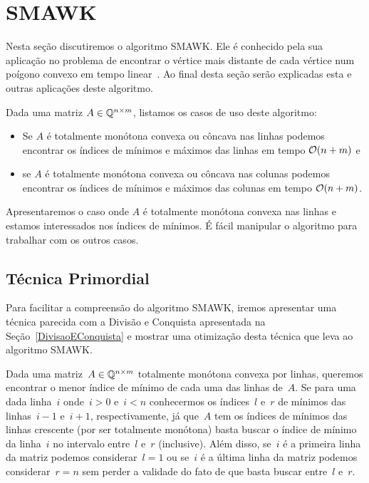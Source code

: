 \section{SMAWK}
\label{SMAWK}


Nesta seção discutiremos o algoritmo SMAWK. Ele é conhecido pela sua aplicação no problema de encontrar o vértice mais distante de cada vértice num poígono convexo em tempo linear~\cite{Aggarwal:1987}. Ao final desta seção serão explicadas esta e outras aplicações deste algoritmo.  

Dada uma matriz $A \in \mathbb{Q}^{n \times m}$, listamos os casos de uso deste algoritmo:
\begin{itemize}
    \item Se $A$ é totalmente monótona convexa ou côncava nas linhas podemos encontrar os índices de mínimos e máximos das linhas em tempo $\mathcal{O}(n + m)$ e
    \item se $A$ é totalmente monótona convexa ou côncava nas colunas podemos encontrar os índices de mínimos e máximos das colunas em tempo $\mathcal{O}(n + m)$.
\end{itemize}

Apresentaremos o caso onde $A$ é totalmente monótona convexa nas linhas e estamos interessados nos índices de mínimos. É fácil manipular o algoritmo para trabalhar com os outros casos.


\subsection{Técnica Primordial} \label{SMAWK:primordial}
Para facilitar a compreensão do algoritmo SMAWK, iremos apresentar uma técnica parecida com a Divisão e Conquista apresentada na Seção~\ref{DivisaoEConquista} e mostrar uma otimização desta técnica que leva ao algoritmo SMAWK.

Dada uma matriz~$A \in \mathbb{Q}^{n \times m}$ totalmente monótona convexa por linhas, queremos encontrar o menor índice de mínimo de cada uma das linhas de~$A$. Se para uma dada linha~$i$ onde~$i > 0$ e~$i < n$ conhecermos os índices~$l$ e~$r$ de mínimos das linhas~$i-1$ e~$i+1$, respectivamente, já que~$A$ tem os índices de mínimos das linhas crescente (por ser totalmente monótona) basta buscar o índice de mínimo da linha~$i$ no intervalo entre~$l$ e~$r$ (inclusive). Além disso, se~$i$ é a primeira linha da matriz podemos considerar~$l = 1$ ou se~$i$ é a última linha da matriz podemos considerar~$r = n$ sem perder a validade do fato de que basta buscar entre~$l$ e~$r$.  

